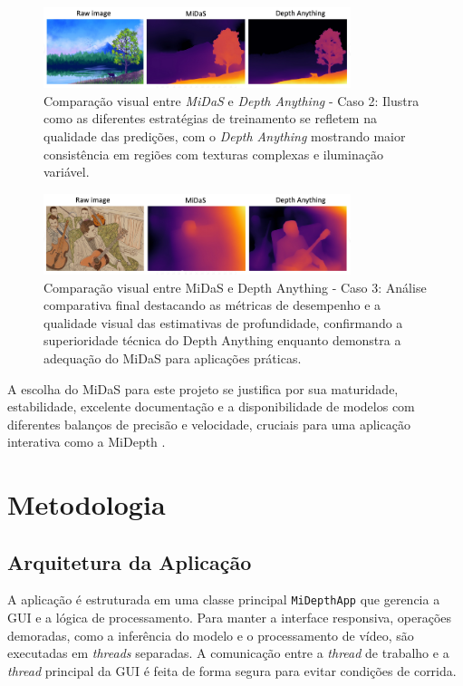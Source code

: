 \documentclass{SBCbookchapter}
\newcommand{\nomeProjeto}{MiDepth }
\begin{document}
    \begin{figure}[h!]
        \centering
        \includegraphics[width=0.8\textwidth]{
            .resources/MiDaS x Depth Anything 02.png
        }
        \caption{Comparação visual entre \textit{MiDaS} e \textit{Depth Anything} -
        Caso 2: Ilustra como as diferentes estratégias de treinamento se refletem na
        qualidade das predições, com o \textit{Depth Anything} mostrando maior consistência
        em regiões com texturas complexas e iluminação variável.}
        \label{fig:comparison2}
    \end{figure}
    
    \begin{figure}[h!]
        \centering
        \includegraphics[width=0.8\textwidth]{
            .resources/MiDaS x Depth Anything 03.png
        }
        \caption{Comparação visual entre MiDaS e Depth Anything - Caso 3: Análise comparativa
        final destacando as métricas de desempenho e a qualidade visual das estimativas
        de profundidade, confirmando a superioridade técnica do Depth Anything
        enquanto demonstra a adequação do MiDaS para aplicações práticas.}
        \label{fig:comparison3}
    \end{figure}

    A escolha do MiDaS para este projeto se justifica por sua maturidade, estabilidade, excelente documentação e a disponibilidade de modelos com diferentes balanços de precisão e velocidade, cruciais para uma aplicação interativa como a \nomeProjeto.

    \section{Metodologia}
    \subsection{Arquitetura da Aplicação}
    A aplicação é estruturada em uma classe principal \texttt{MiDepthApp} que gerencia a GUI e a lógica de processamento. Para manter a interface responsiva, operações demoradas, como a inferência do modelo e o processamento de vídeo, são executadas em \textit{threads} separadas. A comunicação entre a \textit{thread} de trabalho e a \textit{thread} principal da GUI é feita de forma segura para evitar condições de corrida.
\end{document}
